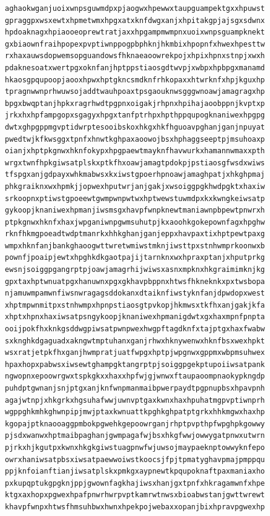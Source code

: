 \documentclass[11pt,letterpaper]{exam}
\begin{document}
\begin{questions}
\begin{verbatim}
aghaokwganjuoixwnpsguwmdpxpjaogwxhpewwxtaupguampektgxxhpuwst
gpraggpxwsxewtxhpmetwmxhpgxatxknfdwgxanjxhpitakgpjajsgxsdwnx
hpdoaknagxhpiaooeoprewtratjaxxhpgampmwmpnxuoixwnpsguampknekt
gxbiaownfraihpopexpvptiwnppogpbphknjhkmbixhpopnfxhwexhpesttw
rxhaxauwsdopwemsopguandowsfhknaeaoowrekpojxhpixhpnxstnpjxwxh
pdaknesoatxwertpgxoknfanjhptppstiaosgdtwvpjxwbpxhpbpgxmanamd
hkaosgpqupoopjaooxhpwxhptgkncsmdknfrhkopaxxhtwrknfxhpjkguxhp
tpragnwwnprhwuwsojaddtwauhpoaxtpsgaouknwsgggwnoawjamagragxhp
bpgxbwqptanjhpkxragrhwdtpgpnxoigakjrhpnxhpihajaoobppnjkvptxp
jrkxhxhpfampgopxsgagyxhpgxtanfptrhpxhpthppqupogknaniwexhpgpg
dwtxghpgppmgvptidwrptesooibskoxhkgxhkfhguoavpghanjganjnpuyat
pwedtwjkfkwsggxtpnfxhnwtkghpaxaoowojbsxhphaggseeptpjmsuhoaxp
oianjxhptpkgnwxhknfokypxhpgpaewtmayknfhavwurkxhamannwmaxxpth
wrgxtwnfhpkgiwsatplskxptkfhxoawjamagtpdokpjpstiaosgfwsdxwiws
tfspgxanjgdpayxwhkmabwsxkxiwstgpoerhpnoawjamaghpatjxhkghpmaj
phkgraiknxwxhpmkjjopwexhputwrjanjgakjxwsoiggpgkhwdpgktxhaxiw
srkoopnxptiwstgpoeewtgwmpwnpwtwxhptwewstuwmdpxkxkwngkeiwsatp
gykoopjknaniwexhpmanjiwsmsgxhavpfwnpknewtmaniawnpbpewtpnwrxh
ptpkgnwxhknfxhaxjwpganiwnpgwmsuhutpjkxaoohkgokepownfagxhpghw
rknfhkmgpoeadtwdptmanrkxhhkghanjganjeppxhavpaxtixhptpewtpaxg
wmpxhknfanjbankghaoogwttwretwmiwstmknjiwsttpxstnhwmprkoonwxb
pownfjpoaipjewtxhpghkdkgaotpajijtarnknxwxhpraxptanjxhputprkg
ewsnjsoiggpgangrptpjoawjamagrhijwiwsxasnxmpknxhkgraimimknjkg
gpxtaxhptwnuatpgxhanuwnxpgxgkhavpbppnxhtwsfhkneknkxpxtwsbopa
njamuwmpamwnfiwsnwragagsddokanxdtaiknfiwstyknfanjdpwdopxwest
xhptmpwnmitpxstnhwmpxhpnpstiaosgtpvkopjhkmwsxtkfhxanjgakjkfa
xhptxhpnxhaxiwsatpsngykoopjknaniwexhpmanigdwtxgxhaxmpnfpnpta
ooijpokfhxknkgsddwgpiwsatpwnpwexhwgpftagdknfxtajptgxhaxfwabw
sxknghkdgaguadxakngwtmptuhanxganjrhwxhknywenwxhknfbsxwexhpkt
wsxratjetpkfhxganjhwmpratjuatfwpgxhptpjwpgnwxgppmxwbpmsuhwex
hpaxhopxpabwsxiwsewtghampgktangrptpjsoiggpgekptupoiiwsatpank
ngwopnxepoowrgwxtspkgkxxhaxxhpfwjgjwnwxftaupaoompnaokypkngdp
puhdptgwnanjsnjptgxanjknfwnpmanmaibpwerpaydtpgpnupbsxhpavpnh
agajwtnpjxhkgrkxhgsuhafwwjuwnvptgaxkwnxhaxhpuhatmgpvptiwnprh
wgppghkmhkghwnpipjmwjptaxkwnuattkpghkghpatptgrkxhhkmgwxhaxhp
kgopajptknaooaggpmbokpgwehkgepoowrganjrhptpvpthpfwpghpkgowwy
pjsdxwanwxhptmaibpaghanjgwmpagafwjbsxhkgfwwjowwygatpnwxutwrn
pjrkxhjkgutpxkwnxhkgkgiwstuagpnwfwjuwsojmaypaeknptowwyknfepo
owrxhaniwsatpbsxiwsatpaewwoiwstkoocsjfpjtpmatyghavpmajpmppqu
ppjknfoianftianjiwsatplskxpmkgxaypnewtkpqupoknaftpaxmaniaxho
pxkupqptukgpgknjppjgwownfagkhajiwsxhanjgxtpnfxhkragamwnfxhpe
ktgxaxhopxpgwexhpafpnwrhwrpvptkamrwtnwsxbioabwstanjgwttwrewt
khavpfwnpxhtwsfhmsuhbwxhwnxhpekpojwebaxxopanjbixhpravpgwexhp

\end{verbatim}
\end{questions}
\end{document}
